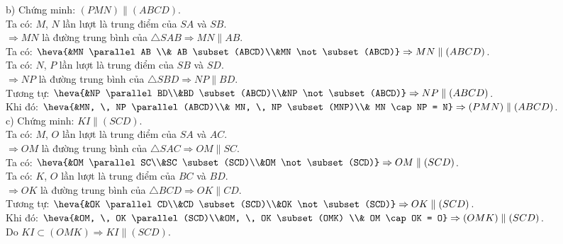 \begin{bt}
{{} \noindent
b) Chứng minh: $(PMN) \parallel (ABCD)$.\\
Ta có: $M$, $N$ lần lượt là trung điểm của $SA$ và $SB$.\\
$\Rightarrow MN $ là đường trung bình của $\triangle SAB \Rightarrow MN \parallel AB$.\\
Ta có: $\heva{&MN \parallel AB \\& AB \subset (ABCD)\\&MN \not\subset (ABCD)} \Rightarrow MN \parallel (ABCD)$.\\
Ta có: $N$, $P$ lần lượt là trung điểm của $SB$ và $SD$.\\
$\Rightarrow NP $ là đường trung bình của $\triangle SBD \Rightarrow NP \parallel BD$.\\
Tương tự: $\heva{&NP \parallel BD\\&BD \subset (ABCD)\\&NP \not\subset (ABCD)} \Rightarrow NP \parallel (ABCD)$.\\
Khi đó: $\heva{&MN, \, NP \parallel (ABCD)\\& MN, \, NP \subset (MNP)\\& MN \cap NP = N} \Rightarrow (PMN) \parallel (ABCD)$.\\
c) Chứng minh: $KI \parallel (SCD)$.\\
Ta có: $M$, $O$ lần lượt là trung điểm của $SA$ và $AC$.\\
$\Rightarrow OM $ là đường trung bình của $\triangle SAC \Rightarrow OM \parallel SC$.\\
Ta có: $\heva{&OM \parallel SC\\&SC \subset (SCD)\\&OM \not\subset (SCD)} \Rightarrow OM \parallel (SCD)$.\\
Ta có: $K$, $O$ lần lượt là trung điểm của $BC$ và $BD$.\\
$\Rightarrow OK $ là đường trung bình của $\triangle BCD \Rightarrow OK \parallel CD$.\\
Tương tự: $\heva{&OK \parallel CD\\&CD \subset (SCD)\\&OK \not\subset (SCD)} \Rightarrow OK \parallel (SCD)$.\\
Khi đó: $\heva{&OM, \, OK \parallel (SCD)\\&OM, \, OK \subset (OMK) \\& OM \cap OK = O} \Rightarrow (OMK) \parallel (SCD)$.\\
Do $KI \subset (OMK) \Rightarrow KI \parallel (SCD)$.

}	
\end{bt}
